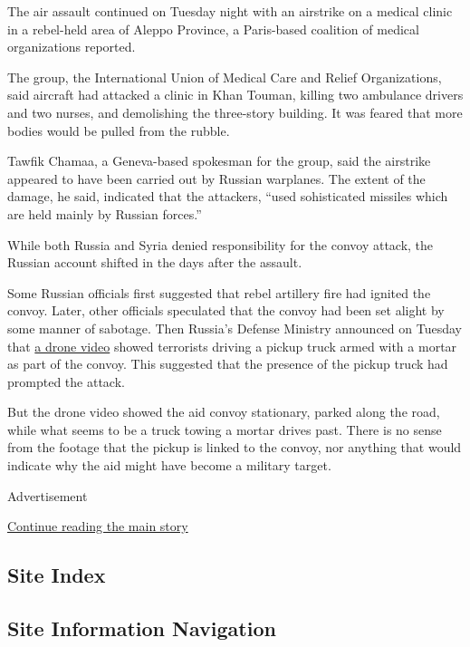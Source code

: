 The air assault continued on Tuesday night with an airstrike on a
medical clinic in a rebel-held area of Aleppo Province, a Paris-based
coalition of medical organizations reported.

The group, the International Union of Medical Care and Relief
Organizations, said aircraft had attacked a clinic in Khan Touman,
killing two ambulance drivers and two nurses, and demolishing the
three-story building. It was feared that more bodies would be pulled
from the rubble.

Tawfik Chamaa, a Geneva-based spokesman for the group, said the
airstrike appeared to have been carried out by Russian warplanes. The
extent of the damage, he said, indicated that the attackers, ``used
sohisticated missiles which are held mainly by Russian forces.''

While both Russia and Syria denied responsibility for the convoy attack,
the Russian account shifted in the days after the assault.

Some Russian officials first suggested that rebel artillery fire had
ignited the convoy. Later, other officials speculated that the convoy
had been set alight by some manner of sabotage. Then Russia's Defense
Ministry announced on Tuesday that
\href{https://yadi.sk/i/ks9vq2Q8vSg3J}{a drone video} showed terrorists
driving a pickup truck armed with a mortar as part of the convoy. This
suggested that the presence of the pickup truck had prompted the attack.

But the drone video showed the aid convoy stationary, parked along the
road, while what seems to be a truck towing a mortar drives past. There
is no sense from the footage that the pickup is linked to the convoy,
nor anything that would indicate why the aid might have become a
military target.

Advertisement

\protect\hyperlink{after-bottom}{Continue reading the main story}

\hypertarget{site-index}{%
\subsection{Site Index}\label{site-index}}

\hypertarget{site-information-navigation}{%
\subsection{Site Information
Navigation}\label{site-information-navigation}}

